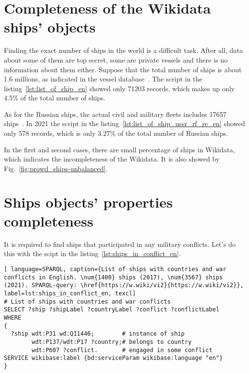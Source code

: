 \section{Completeness of the Wikidata ships' objects}

Finding the exact number of ships in the world is a difficult task. After all, data about some of them are top secret, some are private vessels and there is no information about them either. Suppose that the total number of ships is about 1.6 millions, as indicated in the vessel database~. The script in the listing~\ref{lst:list_of_ship_en} showed only \num{71203} records, which makes up only 4.5\% of the total number of ships. 

As for the Russian ships, the actual civil and military fleets includes \num{17657} ships~. In 2021 the script in the listing~\ref{lst:list_of_ship_ussr_rf_re_en} showed only 578 records, which is only 3.27\% of the total number of Russian ships. 

\label{question:ship_2}

In the first and second cases, there are small percentage of ships in Wikidata, which indicates the incompleteness of the Wikidata. It is also showed by Fig.~\ref{fig:prowd_ships-unbalanced}.


\section{Ships objects' properties completeness}

It is required to find ships that participated in any military conflicts. Let's do this with the scipt in the listing~\ref{lst:ships_in_conflict_en}.

\begin{lstlisting}[ language=SPARQL, caption={List of ships with countries and war conflicts in English. \num{1400} ships (2017), \num{3567} ships (2021). SPARQL-query: \href{https://w.wiki/vi2}{https://w.wiki/vi2}}, label=lst:ships_in_conflict_en, texcl]
# List of ships with countries and war conflicts
SELECT ?ship ?shipLabel ?countryLabel ?conflict ?conflictLabel
WHERE
{
  ?ship wdt:P31 wd:Q11446;        # instance of ship
        wdt:P137/wdt:P17 ?country;# belongs to country
        wdt:P607 ?conflict.       # engaged in some conflict
SERVICE wikibase:label {bd:serviceParam wikibase:language "en"}
}
\end{lstlisting}

